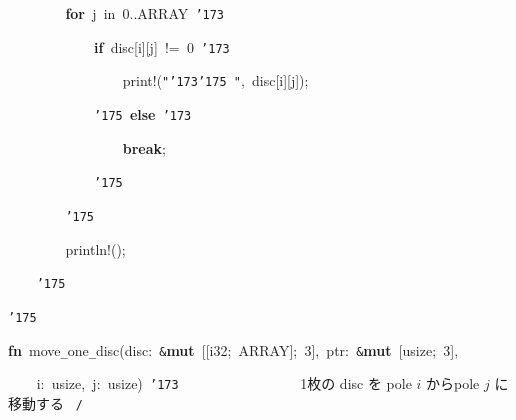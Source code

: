 \documentclass[a4paper,10pt]{article}
\def\mc{\relax}
\begin{document}
\noindent
\mbox{}{\tt\mc \ }{\tt\mc \ }{\tt\mc \ }{\tt\mc \ }{\tt\mc \ }{\tt\mc \ }{\tt\mc \ }{\tt\mc \ }\textbf{for}{\tt\mc \ }j{\tt\mc \ }in{\tt\mc \ }0..ARRAY{\tt\mc \ }{\tt\char'173}

\noindent
\mbox{}{\tt\mc \ }{\tt\mc \ }{\tt\mc \ }{\tt\mc \ }{\tt\mc \ }{\tt\mc \ }{\tt\mc \ }{\tt\mc \ }{\tt\mc \ }{\tt\mc \ }{\tt\mc \ }{\tt\mc \ }\textbf{if}{\tt\mc \ }disc[i][j]{\tt\mc \ }!={\tt\mc \ }0{\tt\mc \ }{\tt\char'173}

\noindent
\mbox{}{\tt\mc \ }{\tt\mc \ }{\tt\mc \ }{\tt\mc \ }{\tt\mc \ }{\tt\mc \ }{\tt\mc \ }{\tt\mc \ }{\tt\mc \ }{\tt\mc \ }{\tt\mc \ }{\tt\mc \ }{\tt\mc \ }{\tt\mc \ }{\tt\mc \ }{\tt\mc \ }print!({\tt "}{\tt\char'173}{\tt\char'175}{\tt\mc \ }{\tt "},{\tt\mc \ }disc[i][j]);

\noindent
\mbox{}{\tt\mc \ }{\tt\mc \ }{\tt\mc \ }{\tt\mc \ }{\tt\mc \ }{\tt\mc \ }{\tt\mc \ }{\tt\mc \ }{\tt\mc \ }{\tt\mc \ }{\tt\mc \ }{\tt\mc \ }{\tt\char'175}{\tt\mc \ }\textbf{else}{\tt\mc \ }{\tt\char'173}

\noindent
\mbox{}{\tt\mc \ }{\tt\mc \ }{\tt\mc \ }{\tt\mc \ }{\tt\mc \ }{\tt\mc \ }{\tt\mc \ }{\tt\mc \ }{\tt\mc \ }{\tt\mc \ }{\tt\mc \ }{\tt\mc \ }{\tt\mc \ }{\tt\mc \ }{\tt\mc \ }{\tt\mc \ }\textbf{break};

\noindent
\mbox{}{\tt\mc \ }{\tt\mc \ }{\tt\mc \ }{\tt\mc \ }{\tt\mc \ }{\tt\mc \ }{\tt\mc \ }{\tt\mc \ }{\tt\mc \ }{\tt\mc \ }{\tt\mc \ }{\tt\mc \ }{\tt\char'175}

\noindent
\mbox{}{\tt\mc \ }{\tt\mc \ }{\tt\mc \ }{\tt\mc \ }{\tt\mc \ }{\tt\mc \ }{\tt\mc \ }{\tt\mc \ }{\tt\char'175}

\noindent
\mbox{}{\tt\mc \ }{\tt\mc \ }{\tt\mc \ }{\tt\mc \ }{\tt\mc \ }{\tt\mc \ }{\tt\mc \ }{\tt\mc \ }println!();

\noindent
\mbox{}{\tt\mc \ }{\tt\mc \ }{\tt\mc \ }{\tt\mc \ }{\tt\char'175}

\noindent
\mbox{}{\tt\char'175}

\noindent
\mbox{}\hfill

\noindent
\mbox{}\textbf{fn}{\tt\mc \ }move{\tt\_}one{\tt\_}disc(disc:{\tt\mc \ }{\tt\&}\textbf{mut}{\tt\mc \ }[[i32;{\tt\mc \ }ARRAY];{\tt\mc \ }3],{\tt\mc \ }ptr:{\tt\mc \ }{\tt\&}\textbf{mut}{\tt\mc \ }[usize;{\tt\mc \ }3],

\noindent
\mbox{}{\tt\mc \ }{\tt\mc \ }{\tt\mc \ }{\tt\mc \ }i:{\tt\mc \ }usize,{\tt\mc \ }j:{\tt\mc \ }usize){\tt\mc \ }{\tt\char'173}{\tt\mc \ }{\tt\mc \ }{\tt\mc \ }{\tt\mc \ }{\tt\mc \ }{\tt\mc \ }{\tt\mc \ }{\tt\mc \ }{\tt\mc \ }{\tt\mc \ }{\tt\mc \ }{\tt\mc \ }{\tt\mc \ }{\tt\mc \ }{\tt\mc \ }\rm\mc {\tt /}{\tt *}\  \ 1枚の disc を pole $i$ からpole $j$ に移動する \hfill \rm\mc \ {\tt *}{\tt /}
\tt\mc 
\end{document}
